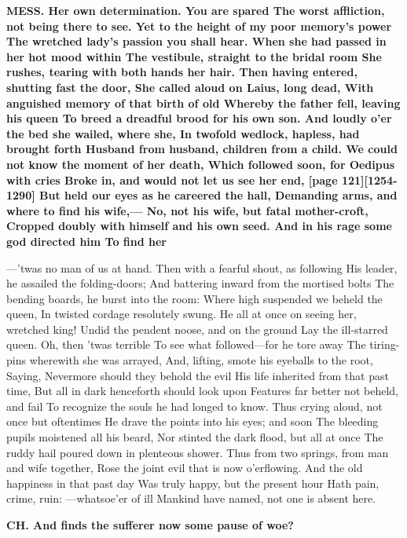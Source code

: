 \documentclass[11pt,letter]{book}
\begin{document}
\par \textbf{MESS. Her own determination. You are spared The worst affliction, not being there to see. Yet to the height of my poor memory’s power The wretched lady’s passion you shall hear. When she had passed in her hot mood within The vestibule, straight to the bridal room She rushes, tearing with both hands her hair. Then having entered, shutting fast the door, She called aloud on Laius, long dead, With anguished memory of that birth of old Whereby the father fell, leaving his queen To breed a dreadful brood for his own son. And loudly o’er the bed she wailed, where she, In twofold wedlock, hapless, had brought forth Husband from husband, children from a child. We could not know the moment of her death, Which followed soon, for Oedipus with cries Broke in, and would not let us see her end, [page 121][1254-1290] But held our eyes as he careered the hall, Demanding arms, and where to find his wife,— No, not his wife, but fatal mother-croft, Cropped doubly with himself and his own seed. And in his rage some god directed him To find her}
\par  —’twas no man of us at hand. Then with a fearful shout, as following His leader, he assailed the folding-doors; And battering inward from the mortised bolts The bending boards, he burst into the room:  Where high suspended we beheld the queen, In twisted cordage resolutely swung. He all at once on seeing her, wretched king! Undid the pendent noose, and on the ground Lay the ill-starred queen. Oh, then ’twas terrible To see what followed—for he tore away The tiring-pins wherewith she was arrayed, And, lifting, smote his eyeballs to the root, Saying, Nevermore should they behold the evil His life inherited from that past time, But all in dark henceforth should look upon Features far better not beheld, and fail To recognize the souls he had longed to know. Thus crying aloud, not once but oftentimes He drave the points into his eyes; and soon The bleeding pupils moistened all his beard, Nor stinted the dark flood, but all at once The ruddy hail poured down in plenteous shower. Thus from two springs, from man and wife together, Rose the joint evil that is now o’erflowing. And the old happiness in that past day Was truly happy, but the present hour Hath pain, crime, ruin: —whatsoe’er of ill Mankind have named, not one is absent here.

\par \textbf{CH. And finds the sufferer now some pause of woe?}
\par 
\end{document}
